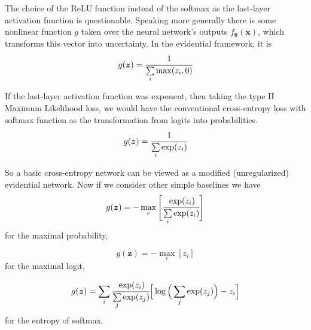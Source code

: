 \documentclass{article}
\begin{document}
The choice of the ReLU function instead of the softmax as the last-layer activation function is questionable.
Speaking more generally there is some nonlinear function $g$ taken over the neural network's outputs $f_{\boldsymbol{\theta}}(\boldsymbol{x})$, which transforms this vector into uncertainty.
In the evidential framework, it is
\begin{equation}
g(\boldsymbol{z}) = \cfrac{1}{\sum\limits_i \max(z_i, 0)}
\end{equation}

If the last-layer activation function was exponent, then taking the type II Maximum Likelihood loss, we would have the conventional cross-entropy loss with softmax function as the transformation from logits into probabilities.
\begin{equation}
g(\boldsymbol{z}) = \cfrac{1}{\sum\limits_i \exp(z_i)}
\end{equation}

So a basic cross-entropy network can be viewed as a modified (unregularized) evidential network.
Now if we consider other simple baselines we have
\begin{equation}
g(\boldsymbol{z}) = -\max_c \Bigg[ \cfrac{\exp(z_i)}{\sum\limits_{i} \exp(z_i)} \Bigg]
\end{equation}
for the maximal probability,

\begin{equation}
g(\boldsymbol{z}) = -\max_c [z_i]
\end{equation}
for the maximal logit,

\begin{equation}
g(\boldsymbol{z}) = \sum\limits_i \cfrac{\exp(z_i)}{\sum\limits_j \exp(z_j)} \Big[\log \Big( \sum\limits_j \exp(z_j) \Big) - z_i \Big]
\end{equation}
for the entropy of softmax.
\end{document}
